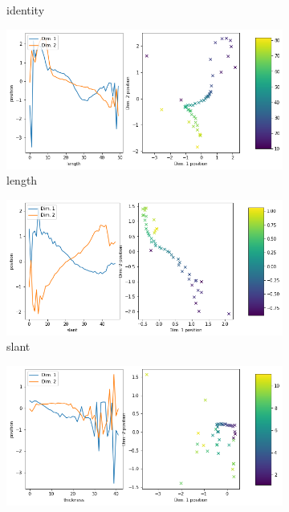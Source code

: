 \begin{figure}[H]
\begin{subfigure}{.48\textwidth}
        \caption{identity}
    \end{subfigure}
    \hfill
    \begin{subfigure}{.48\textwidth}
        \includegraphics[width=\textwidth]{images/latent_space_traversals/vae_mnist_morpho_latent_space_values_length.png}
        \caption{length}
    \end{subfigure}
    \begin{subfigure}{.48\textwidth}
        \includegraphics[width=\textwidth]{images/latent_space_traversals/vae_mnist_morpho_latent_space_values_slant.png}
        \caption{slant}
    \end{subfigure}
    \hfill
    \begin{subfigure}{.48\textwidth}
        \includegraphics[width=\textwidth]{images/latent_space_traversals/vae_mnist_morpho_latent_space_values_thickness.png}

\end{subfigure}
\end{figure}
